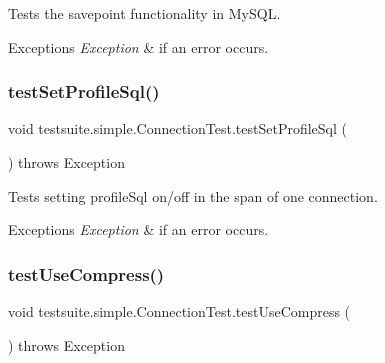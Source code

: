 Tests the savepoint functionality in My\+S\+QL.


\begin{DoxyExceptions}{Exceptions}
{\em Exception} & if an error occurs. \\
\hline
\end{DoxyExceptions}
\mbox{\label{classtestsuite_1_1simple_1_1_connection_test_a279c085ad223ecdc6dc0a53ed7d73abb}} 
\subsubsection{\texorpdfstring{test\+Set\+Profile\+Sql()}{testSetProfileSql()}}
{\footnotesize\ttfamily void testsuite.\+simple.\+Connection\+Test.\+test\+Set\+Profile\+Sql (\begin{DoxyParamCaption}{ }\end{DoxyParamCaption}) throws Exception}

Tests setting profile\+Sql on/off in the span of one connection.


\begin{DoxyExceptions}{Exceptions}
{\em Exception} & if an error occurs. \\
\hline
\end{DoxyExceptions}
\mbox{\label{classtestsuite_1_1simple_1_1_connection_test_ab5c3f7762742c5135e360e5ad11f59e5}} 
\subsubsection{\texorpdfstring{test\+Use\+Compress()}{testUseCompress()}}
{\footnotesize\ttfamily void testsuite.\+simple.\+Connection\+Test.\+test\+Use\+Compress (\begin{DoxyParamCaption}{ }\end{DoxyParamCaption}) throws Exception}

